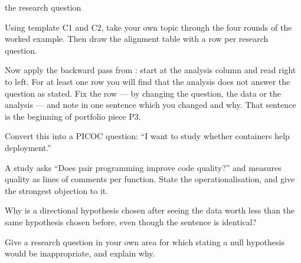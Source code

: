\begin{traditions}{the research question}
\end{traditions}

\begin{lab}
Using template C1 and C2, take your own topic through the four rounds of the
worked example. Then draw the alignment table with a row per research question.

\medskip
Now apply the backward pass from : start at the analysis
column and read right to left. For at least one row you will find that the
analysis does not answer the question as stated. Fix the row --- by changing
the question, the data or the analysis --- and note in one sentence which you
changed and why. That sentence is the beginning of portfolio piece P3.
\end{lab}

\begin{checkpoint}
\begin{tightnum}
  \item Convert this into a PICOC question: ``I want to study whether
    containers help deployment.''
  \item A study asks ``Does pair programming improve code quality?'' and
    measures quality as lines of comments per function. State the
    operationalisation, and give the strongest objection to it.
  \item Why is a directional hypothesis chosen after seeing the data worth less
    than the same hypothesis chosen before, even though the sentence is
    identical?
  \item Give a research question in your own area for which stating a null
    hypothesis would be inappropriate, and explain why.
\end{tightnum}
\end{checkpoint}

